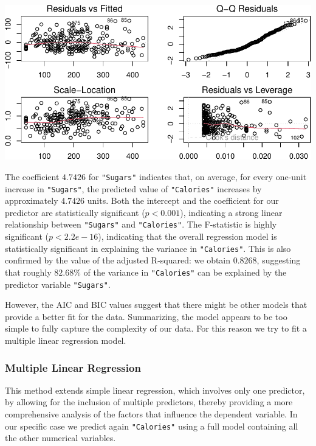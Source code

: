 \documentclass[
]{article}
\begin{document}
\begin{center}\includegraphics{Statistical_Learning_Final_Report_files/figure-latex/simple_linear_regression-1} \end{center}

The coefficient \(4.7426\) for \texttt{"Sugars"} indicates that, on
average, for every one-unit increase in \texttt{"Sugars"}, the predicted
value of \texttt{"Calories"} increases by approximately \(4.7426\)
units. Both the intercept and the coefficient for our predictor are
statistically significant (\(p < 0.001\)), indicating a strong linear
relationship between \texttt{"Sugars"} and \texttt{"Calories"}. The
F-statistic is highly significant (\(p < 2.2e-16\)), indicating that the
overall regression model is statistically significant in explaining the
variance in \texttt{"Calories"}. This is also confirmed by the value of
the adjusted R-squared: we obtain \(0.8268\), suggesting that roughly
\(82.68\)\% of the variance in \texttt{"Calories"} can be explained by
the predictor variable \texttt{"Sugars"}.

However, the AIC and BIC values suggest that there might be other models
that provide a better fit for the data. Summarizing, the model appears
to be too simple to fully capture the complexity of our data. For this
reason we try to fit a multiple linear regression model.

\subsubsection{Multiple Linear
Regression}\label{multiple-linear-regression}

This method extends simple linear regression, which involves only one
predictor, by allowing for the inclusion of multiple predictors, thereby
providing a more comprehensive analysis of the factors that influence
the dependent variable. In our specific case we predict again
\texttt{"Calories"} using a full model containing all the other
numerical variables.
\end{document}
